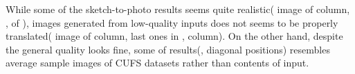 While some of the sketch-to-photo results seems quite realistic( image of  column, ,  of ), images generated from low-quality inputs does not seems to be properly translated( image of  column, last ones in ,  column). 
On the other hand, despite the general quality looks fine, some of results(,  diagonal positions) resembles average sample images of CUFS datasets rather than contents of input.

\endinput
